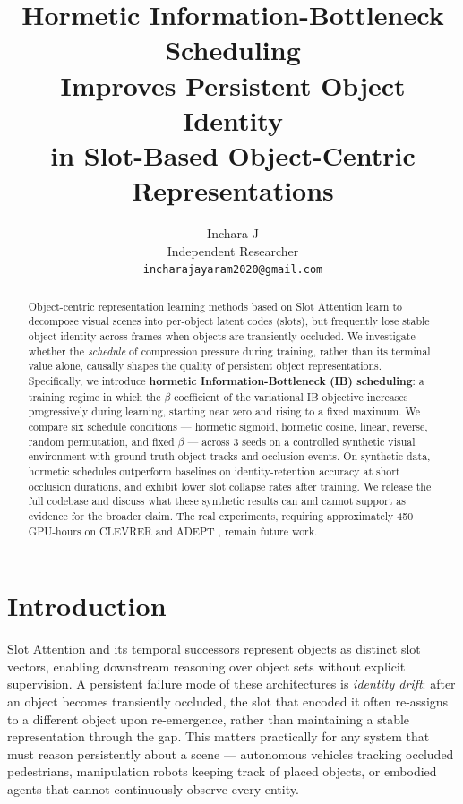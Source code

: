 \documentclass{article}
\title{Hormetic Information-Bottleneck Scheduling\\
Improves Persistent Object Identity\\
in Slot-Based Object-Centric Representations}
\author{%
  Inchara J \\
  Independent Researcher \\
  \texttt{incharajayaram2020@gmail.com}
}
\begin{document}
\maketitle

\begin{abstract}
Object-centric representation learning methods based on Slot Attention learn
to decompose visual scenes into per-object latent codes (slots), but frequently
lose stable object identity across frames when objects are transiently occluded.
We investigate whether the \emph{schedule} of compression pressure during
training, rather than its terminal value alone, causally shapes the quality of
persistent object representations.
Specifically, we introduce \textbf{hormetic Information-Bottleneck (IB) scheduling}:
a training regime in which the $\beta$ coefficient of the variational IB objective
increases progressively during learning, starting near zero and rising to a
fixed maximum.
We compare six schedule conditions --- hormetic sigmoid, hormetic cosine,
linear, reverse, random permutation, and fixed $\beta$ --- across 3 seeds on a
controlled synthetic visual environment with ground-truth object tracks and
occlusion events.
On synthetic data, hormetic schedules outperform baselines on identity-retention
accuracy at short occlusion durations, and exhibit lower slot collapse rates
after training.
We release the full codebase and discuss what these synthetic results can and
cannot support as evidence for the broader claim.
The real experiments, requiring approximately 450 GPU-hours on CLEVRER
\cite{chen2020clevrer} and ADEPT \cite{kortmann2022adept}, remain future work.
\end{abstract}

\section{Introduction}

Slot Attention \cite{locatello2020object} and its temporal successors
\cite{kipf2021conditional} represent objects as distinct slot vectors, enabling
downstream reasoning over object sets without explicit supervision.
A persistent failure mode of these architectures is \emph{identity drift}: after
an object becomes transiently occluded, the slot that encoded it often re-assigns
to a different object upon re-emergence, rather than maintaining a stable
representation through the gap.
This matters practically for any system that must reason persistently about a
scene --- autonomous vehicles tracking occluded pedestrians, manipulation robots
keeping track of placed objects, or embodied agents that cannot continuously
observe every entity.
\end{document}
